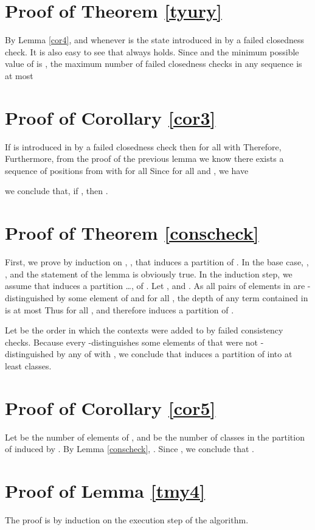 \documentclass[preprint,12pt,english]{article}
\begin{document}
\section{Proof of Theorem \ref{tyury}}
By Lemma \ref{cor4},  and  whenever  is the state introduced in  by a failed closedness check. It is also easy to see that  always holds. 
Since  and the minimum possible value of  is ,  the maximum number of failed closedness checks in any sequence 
 is at most 


\section{Proof of Corollary \ref{cor3}}
If  is introduced in  by a failed closedness check then  for all  with  Therefore,  Furthermore, from the proof of the previous lemma we know there exists a sequence  of positions from  with  for all  Since  for all  and , we have

 we conclude that, if , then . 
\section{Proof of Theorem \ref{conscheck}}
First, we prove by induction on , , that  induces a partition of . 
In the base case, , , and the statement of the lemma is obviously true.
In the induction step, we assume that  induces a partition  \ldots,  of .  Let , and . As all pairs of elements in  are -distinguished by some element of  and  for all , the depth of any term contained in  is at most  Thus  for all , and therefore  induces a partition of .

Let  be the order in which the contexts were added to  by failed consistency checks. Because every  -distinguishes some elements of  that were not -distinguished by any of  with , we conclude that  induces a partition of  into at least  classes. 

\section{Proof of Corollary  \ref{cor5}}
 Let  be the number of elements of , and  be the number of classes in the partition of  induced by . By Lemma \ref{conscheck}, . Since ,  we conclude that .
\section{Proof of Lemma \ref{tmy4}}
The proof is by induction on the execution step  of the algorithm.
\end{document}
